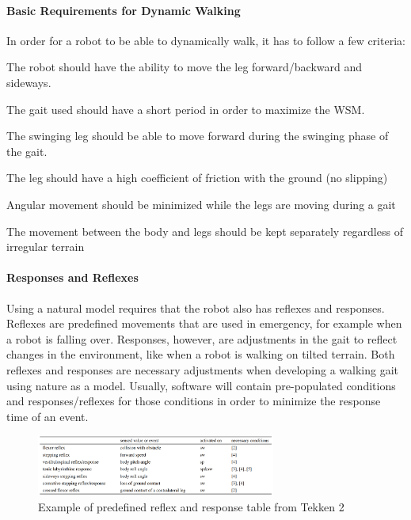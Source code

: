             \paragraph{Basic Requirements for Dynamic Walking}
                In order for a robot to be able to dynamically walk, it has to follow a few criteria: \cite{AdaptiveDynamicWalking}
                \begin{Deliverables}
                    \item The robot should have the ability to move the leg forward/backward and sideways.
                    \item The gait used should have a short period in order to maximize the WSM.
                    \item The swinging leg should be able to move forward during the swinging phase of the gait.
                    \item The leg should have a high coefficient of friction with the ground (no slipping)
                    \item Angular movement should be minimized while the legs are moving during a gait
                    \item The movement between the body and legs should be kept separately regardless of irregular terrain
                \end{Deliverables}
            \paragraph{Responses and Reflexes}
                Using a natural model requires that the robot also has reflexes and responses. Reflexes are predefined movements that are used in emergency, for example when a robot is falling over. Responses, however, are adjustments in the gait to reflect changes in the environment, like when a robot is walking on tilted terrain. Both reflexes and responses are necessary adjustments when developing a walking gait using nature as a model. Usually, software will contain pre-populated conditions and responses/reflexes for those conditions in order to minimize the response time of an event.
                \begin{figure}[H]
                    \centering
                    \includegraphics[width=0.7\textwidth]{figures/Tekken2ReflexResponses.png}
                    \caption{Example of predefined reflex and response table from Tekken 2 \cite{AdaptiveDynamicWalking}}
                    \label{fig:reflexresponsetable}
                \end{figure}

